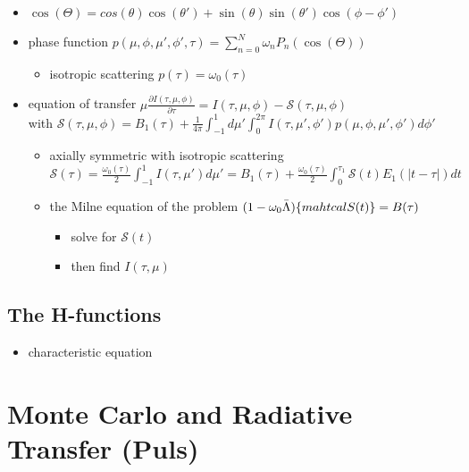 \documentclass[../main/main.tex]{subfiles}
\begin{document}
\begin{itemize}
\item $\cos(\Theta) = cos(\theta)\cos(\theta') + \sin(\theta)\sin(\theta') \cos(\phi-\phi')$

\item phase function $\boxed{p(\mu,\phi,\mu',\phi',\tau) = \sum_{n=0}^N \omega_n P_n(\cos(\Theta))}$
\begin{itemize}

\item isotropic scattering $p(\tau) = \omega_0(\tau)$
\end{itemize}

\item equation of transfer $\boxed{\mu \frac{\partial I(\tau,\mu,\phi)}{\partial \tau} = I(\tau,\mu,\phi) - \mathcal{S}(\tau,\mu,\phi)}$ 
\\ with $\mathcal{S}(\tau,\mu,\phi) = B_1(\tau) + \frac{1}{4 \pi} \int_{-1}^{1} d\mu' \int_0^{2\pi} I(\tau,\mu',\phi') p(\mu,\phi,\mu',\phi') d\phi'$
\begin{itemize}
\item axially symmetric with isotropic scattering \\
$\mathcal{S}(\tau) = \frac{\omega_0(\tau)}{2} \int_{-1}^{1} I(\tau,\mu') d\mu' = 
B_1(\tau) + \frac{\omega_0(\tau)}{2} \int_0^{\tau_1} \mathcal{S} (t) E_1(|t-\tau|)dt $
\item the Milne equation of the problem $(1-\omega_0 \bar{\Lambda})\{ \\mahtcal{S}(t)\} = B(\tau)$
\begin{itemize}
\item solve for $\mathcal{S}(t)$
\item then find $I(\tau,\mu)$
\end{itemize}

\end{itemize}
\end{itemize}

\subsection{The H-functions}
\begin{itemize}
\item characteristic equation
\end{itemize}

\newpage
\section{Monte Carlo and Radiative Transfer (Puls)}
\end{document}
